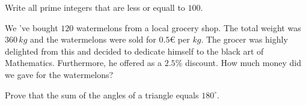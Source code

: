 \begin{exercise}
\item  Write all prime integers that are less or equall to $100$.
\item We 've bought $120$ watermelons from a local grocery shop. The total weight was $360\, kg$ and the watermelons were sold for $0.5\euro$ per $kg$. The grocer was highly delighted from this and decided to dedicate himself to the black art of Mathematics. Furthermore, he offered as a $2.5\%$ discount. How much money did we gave for the watermelons?
\item Prove that the sum of the angles of a triangle equals $180^\circ$.
\end{exercise}